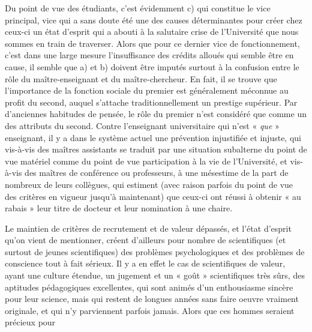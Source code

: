 \documentclass[11pt,a4paper]{article}
\begin{document}
Du point de vue des étudiants, c'est évidemment c) qui constitue
le vice principal, vice qui a sans doute été une des causes déterminantes
pour créer chez ceux-ci un état d'esprit qui a abouti à la salutaire crise
de l'Université que nous sommes en train de traverser. Alors que pour ce
dernier vice de fonctionnement, c'est dans une large mesure l'insuffisance
des crédits alloués qui semble être en cause, il semble que a) et b) doivent
être imputés surtout à la confusion entre le rôle du maître-enseignant et du
maître-chercheur. En fait, il se trouve que l'importance de la fonction
sociale du premier est généralement méconnue au profit du second, auquel
s'attache traditionnellement un prestige supérieur. Par d'anciennes habitudes
de pensée, le rôle du premier n'est considéré que comme un des attributs du
second. Contre l'enseignant universitaire qui n'est « \emph{que} » enseignant, il
y a dans le système actuel une prévention injustifiée et injuste, qui
vis-à-vis des maîtres assistants se traduit par une situation subalterne du
point de vue matériel comme du point de vue participation à la vie de
l'Université, et vis-à-vis des maîtres de conférence ou professeurs, à une
mésestime de la part de nombreux de leurs collègues, qui estiment (avec raison
parfois du point de vue des critères en vigueur jusqu'à maintenant) que
ceux-ci ont réussi à obtenir « au rabais » leur titre de docteur et leur
nomination à une chaire.

Le maintien de critères de recrutement et de valeur dépassés, et
l'état d'esprit qu'on vient de mentionner, créent d'ailleurs pour nombre
de scientifiques (et surtout de jeunes scientifiques) des problèmes
psychologiques et des problèmes de conscience tout à fait sérieux. Il y a en effet
le cas de scientifiques de valeur, ayant une culture étendue, un jugement
et un « goût » scientifiques très sûrs, des aptitudes pédagogiques excellentes,
qui sont animés d'un enthousiasme sincère pour leur science, mais qui
restent de longues années sans faire oeuvre vraiment originale, et qui n'y
parviennent parfois jamais. Alors que ces hommes seraient précieux pour
\end{document}
